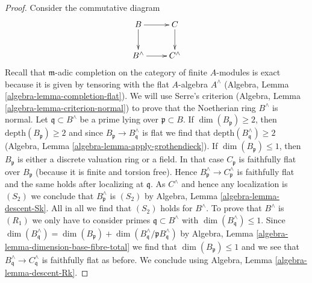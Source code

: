 \documentclass[10pt,a4paper]{amsart}
\theoremstyle{plain}
\theoremstyle{definition}
\theoremstyle{remark}
\numberwithin{equation}{subsection}
\begin{document}
\begin{proof}
Consider the commutative diagram
$$
\xymatrix{
B \ar[r] \ar[d] & C \ar[d] \\
B^\wedge \ar[r] & C^\wedge
}
$$
Recall that $\mathfrak m$-adic completion on the category of
finite $A$-modules is exact because it is given by tensoring with
the flat $A$-algebra $A^\wedge$
(Algebra, Lemma \ref{algebra-lemma-completion-flat}).
We will use Serre's criterion
(Algebra, Lemma \ref{algebra-lemma-criterion-normal})
to prove that the Noetherian ring $B^\wedge$ is normal.
Let $\mathfrak q \subset B^\wedge$ be a prime lying over
$\mathfrak p \subset B$. If $\dim(B_\mathfrak p) \geq 2$, then
$\text{depth}(B_\mathfrak p) \geq 2$ and since
$B_\mathfrak p \to B^\wedge_\mathfrak q$ is flat we find
that $\text{depth}(B^\wedge_\mathfrak q) \geq 2$
(Algebra, Lemma \ref{algebra-lemma-apply-grothendieck}).
If $\dim(B_\mathfrak p) \leq 1$, then $B_\mathfrak p$ is
either a discrete valuation ring or a field.
In that case $C_\mathfrak p$ is faithfully flat over $B_\mathfrak p$
(because it is finite and torsion free).
Hence $B^\wedge_\mathfrak p \to C^\wedge_\mathfrak p$ is
faithfully flat and the same holds after localizing at $\mathfrak q$.
As $C^\wedge$ and hence any localization is $(S_2)$ we conclude that
$B^\wedge_\mathfrak p$ is $(S_2)$ by
Algebra, Lemma \ref{algebra-lemma-descent-Sk}.
All in all we find that
$(S_2)$ holds for $B^\wedge$. To prove that $B^\wedge$ is
$(R_1)$ we only have to consider primes $\mathfrak q \subset B^\wedge$
with $\dim(B^\wedge_\mathfrak q) \leq 1$. Since
$\dim(B^\wedge_\mathfrak q) = \dim(B_\mathfrak p) +
\dim(B^\wedge_\mathfrak q/\mathfrak p B^\wedge_\mathfrak q)$ by
Algebra, Lemma \ref{algebra-lemma-dimension-base-fibre-total}
we find that $\dim(B_\mathfrak p) \leq 1$ and
we see that $B^\wedge_\mathfrak q \to C^\wedge_\mathfrak q$
is faithfully flat as before. We conclude using
Algebra, Lemma \ref{algebra-lemma-descent-Rk}.
\end{proof}
\end{document}

